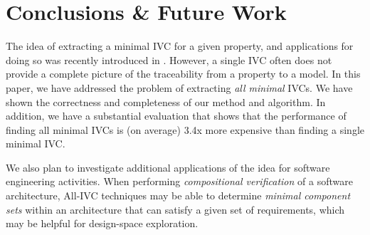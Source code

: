 \section{Conclusions \& Future Work}
\label{sec:conc}
The idea of extracting a minimal IVC for a given property, and applications for doing so was recently introduced in \cite{Ghass16}.  However, a single IVC often does not provide a complete picture of the traceability from a property to a model.  In this paper, we have addressed the problem of extracting {\em all minimal} IVCs. We have shown
the correctness and completeness of our method and algorithm.  In addition, we have a substantial evaluation that shows that the performance of finding all minimal IVCs is (on average) 3.4x more expensive than finding a single minimal IVC.


We also plan to investigate additional applications of the idea for software engineering activities.  When performing {\em compositional verification} of a software architecture, All-IVC techniques may be able to determine {\em minimal component sets} within an architecture that can satisfy a given set of requirements, which may be helpful for design-space exploration.